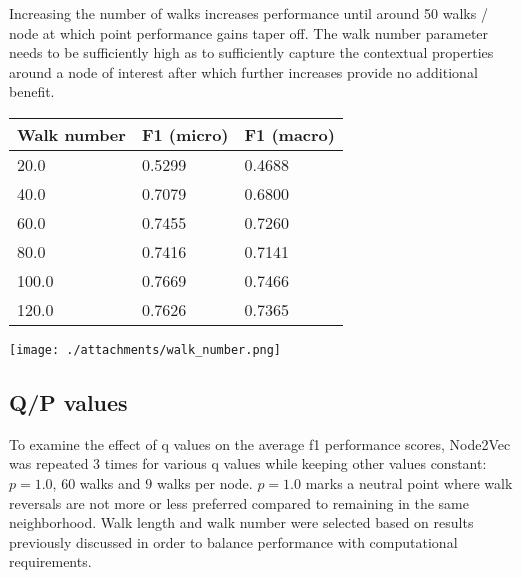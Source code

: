 \documentclass[a4paper,10pt]{article}
\begin{document}
 Increasing the number of walks increases performance until around 50 walks / node at which point performance gains taper off. The walk number parameter needs to be sufficiently high as to sufficiently capture the contextual properties around a node of interest after which further increases provide no additional benefit.

  \begin{minipage}[t][17em][c]{0.49\textwidth}
    \begin{tabular}{m{4em} m{7em} m{7em}}

      \hline
      Walk number & F1 (micro)  & F1 (macro) \\
      \hline\hline

      20.0	&  0.5299	&  0.4688 \\
      \hline
      40.0	&  0.7079	&  0.6800 \\
      \hline
      60.0	&  0.7455	&  0.7260 \\
      \hline
      80.0	&  0.7416	&  0.7141 \\
      \hline
      100.0	&  0.7669	&  0.7466 \\
      \hline
      120.0	&  0.7626	&  0.7365 \\
      \hline

    \end{tabular}

    \label{tbl:cora:performance:walk_number}
  \end{minipage}
  \begin{minipage}[t][17em][c]{0.49\textwidth}
    \texttt{[image: ./attachments/walk\_number.png]}
      \label{fig:cora:performance:walk_number}
  \end{minipage}

\subsection{Q/P values}

To examine the effect of q values on the average f1 performance scores, Node2Vec was repeated 3 times for various q values while keeping other values constant: $p = 1.0$, $60$ walks and $9$ walks per node. $p = 1.0$ marks a neutral point where walk reversals are not more or less preferred compared to remaining in the same neighborhood. Walk length and walk number were selected based on results previously discussed in order to balance performance with computational requirements.
\end{document}
